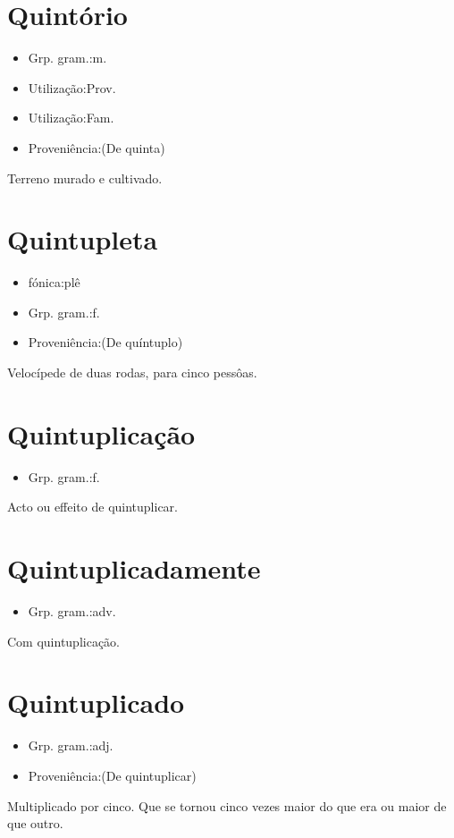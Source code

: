 \section{Quintório}
\begin{itemize}
\item {Grp. gram.:m.}
\end{itemize}
\begin{itemize}
\item {Utilização:Prov.}
\end{itemize}
\begin{itemize}
\item {Utilização:Fam.}
\end{itemize}
\begin{itemize}
\item {Proveniência:(De \textunderscore quinta\textunderscore )}
\end{itemize}
Terreno murado e cultivado.
\section{Quintupleta}
\begin{itemize}
\item {fónica:plê}
\end{itemize}
\begin{itemize}
\item {Grp. gram.:f.}
\end{itemize}
\begin{itemize}
\item {Proveniência:(De \textunderscore quíntuplo\textunderscore )}
\end{itemize}
Velocípede de duas rodas, para cinco pessôas.
\section{Quintuplicação}
\begin{itemize}
\item {Grp. gram.:f.}
\end{itemize}
Acto ou effeito de quintuplicar.
\section{Quintuplicadamente}
\begin{itemize}
\item {Grp. gram.:adv.}
\end{itemize}
Com quintuplicação.
\section{Quintuplicado}
\begin{itemize}
\item {Grp. gram.:adj.}
\end{itemize}
\begin{itemize}
\item {Proveniência:(De \textunderscore quintuplicar\textunderscore )}
\end{itemize}
Multiplicado por cinco.
Que se tornou cinco vezes maior do que era ou maior de que outro.
